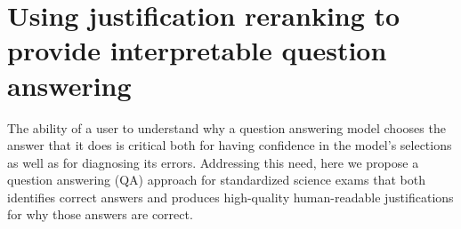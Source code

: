 \section{Using justification reranking to provide interpretable question answering}
\label{sec-cl2017:relatedwork}

The ability of a user to understand why a question answering model chooses the answer that it does is critical both for having confidence in the model's selections as well as for diagnosing its errors.  Addressing this need, here we propose a question answering (QA) approach for standardized science exams that both identifies correct answers and produces high-quality human-readable justifications for why those answers are correct. 

%

